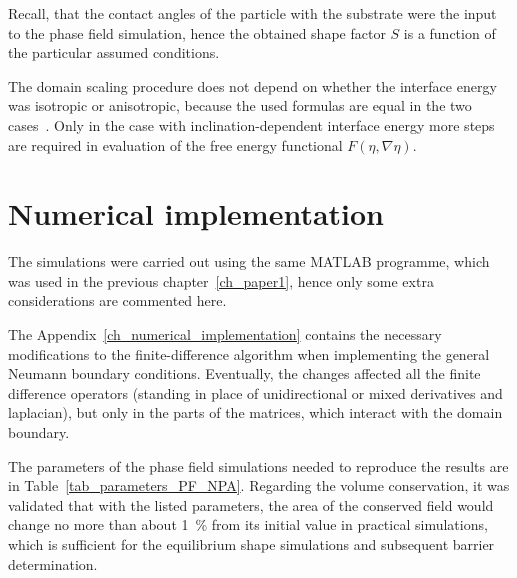 Recall, that the contact angles of the particle with the substrate were the input to the phase field simulation, hence the obtained shape factor $S$ is a function of the particular assumed conditions. 

The domain scaling procedure does not depend on whether the interface energy was isotropic or anisotropic, because the used formulas are equal in the two cases~\cite{Mariaux2011}. Only in the case with inclination-dependent interface energy more steps are required in evaluation of the free energy functional $F(\eta,\nabla\eta)$.

\section{Numerical implementation}
The simulations were carried out using the same MATLAB programme, which was used in the previous chapter~\ref{ch_paper1}, hence only some extra considerations are commented here.

The Appendix~\ref{ch_numerical_implementation} contains the necessary modifications to the finite-difference algorithm when implementing the general Neumann boundary conditions. Eventually, the changes affected all the finite difference operators (standing in place of unidirectional or mixed derivatives and laplacian), but only in the parts of the matrices, which interact with the domain boundary.

The parameters of the phase field simulations needed to reproduce the results are in Table~\ref{tab_parameters_PF_NPA}. Regarding the volume conservation, it was validated that with the listed parameters, the area of the conserved field would change no more than about 1~\% from its initial value in practical simulations, which is sufficient for the equilibrium shape simulations and subsequent barrier determination.

